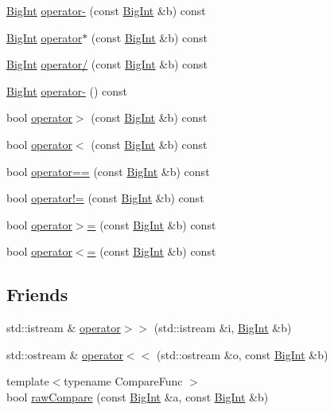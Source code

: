 \begin{DoxyCompactItemize}
\hyperlink{class_big_int}{Big\+Int} \hyperlink{class_big_int_a64ef59813d4221635ae33f8de10f88cb}{operator-\/} (const \hyperlink{class_big_int}{Big\+Int} \&b) const 
\item 
\hyperlink{class_big_int}{Big\+Int} \hyperlink{class_big_int_aa4e3204ae4a0c81e8e33d0a848078a8d}{operator$\ast$} (const \hyperlink{class_big_int}{Big\+Int} \&b) const 
\item 
\hyperlink{class_big_int}{Big\+Int} \hyperlink{class_big_int_ab5679019b8821c01b161147495e21a4e}{operator/} (const \hyperlink{class_big_int}{Big\+Int} \&b) const 
\item 
\hyperlink{class_big_int}{Big\+Int} \hyperlink{class_big_int_a56350bc8395ed38c2afdbb4554e56b1f}{operator-\/} () const 
\item 
bool \hyperlink{class_big_int_a4631ce319f6617a43a4dc89127953ebb}{operator$>$} (const \hyperlink{class_big_int}{Big\+Int} \&b) const 
\item 
bool \hyperlink{class_big_int_a56b4522f02907f0d719809a0e81c525e}{operator$<$} (const \hyperlink{class_big_int}{Big\+Int} \&b) const 
\item 
bool \hyperlink{class_big_int_a057d936831e7a103a1830366c990602f}{operator==} (const \hyperlink{class_big_int}{Big\+Int} \&b) const 
\item 
bool \hyperlink{class_big_int_ad6a59ed7dedbe35433c1a83ca751fe88}{operator!=} (const \hyperlink{class_big_int}{Big\+Int} \&b) const 
\item 
bool \hyperlink{class_big_int_ae5bdb87103df4be652062b015a1fa653}{operator$>$=} (const \hyperlink{class_big_int}{Big\+Int} \&b) const 
\item 
bool \hyperlink{class_big_int_ada9b7b9e96bb3aad13c48637397b6f31}{operator$<$=} (const \hyperlink{class_big_int}{Big\+Int} \&b) const 
\end{DoxyCompactItemize}
\subsection*{Friends}
\begin{DoxyCompactItemize}
\item 
std\+::istream \& \hyperlink{class_big_int_abfb3d978331870b4cba82ece17354f44}{operator$>$$>$} (std\+::istream \&i, \hyperlink{class_big_int}{Big\+Int} \&b)
\item 
std\+::ostream \& \hyperlink{class_big_int_a0d8814d1177634c5e0ee08e2bbccf328}{operator$<$$<$} (std\+::ostream \&o, const \hyperlink{class_big_int}{Big\+Int} \&b)
\item 
{\footnotesize template$<$typename Compare\+Func $>$ }\\bool \hyperlink{class_big_int_a95ccae99f465fac11bf28196f62dac03}{raw\+Compare} (const \hyperlink{class_big_int}{Big\+Int} \&a, const \hyperlink{class_big_int}{Big\+Int} \&b)
\end{DoxyCompactItemize}


